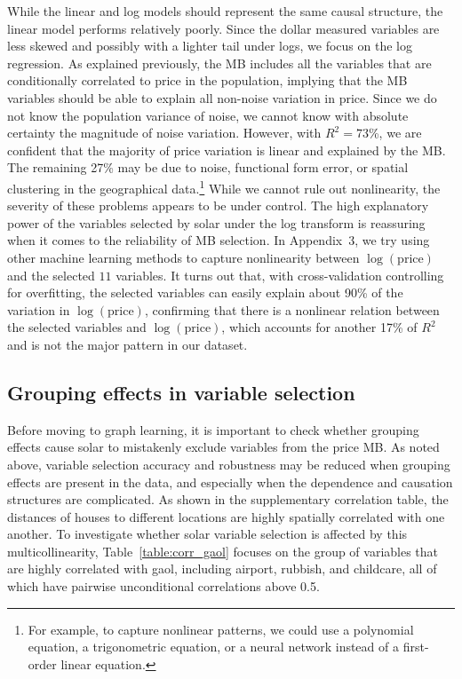 \documentclass[11pt,review,authoryear]{elsarticle}
\begin{document}
While the linear and log models should represent the same causal structure, the linear model performs relatively poorly. Since the dollar measured variables are less skewed and possibly with a lighter tail under logs, we focus on the log regression. As explained previously, the MB includes all the variables that are conditionally correlated to price in the population, implying that the MB variables should be able to explain all non-noise variation in price. Since we do not know the population variance of noise, we cannot know with absolute certainty the magnitude of noise variation. However, with $R^2=73$\%, we are confident that the majority of price variation is linear and explained by the MB. The remaining 27\% may be due to noise, functional form error, or spatial clustering in the geographical data.\footnote{For example, to capture nonlinear patterns, we could use a polynomial equation, a trigonometric equation, or a neural network instead of a first-order linear equation.} While we cannot rule out nonlinearity, the severity of these problems appears to be under control. The high explanatory power of the variables selected by solar under the log transform is reassuring when it comes to the reliability of MB selection. In Appendix~3, we try using other machine learning methods to capture nonlinearity between $\log \left( \mathrm{price} \right)$ and the selected $11$ variables. \textcolor[rgb]{0.00,0.00,1.00}{It turns out that, with cross-validation controlling for overfitting, the selected variables can easily explain about 90\% of the variation in $\log \left( \mathrm{price} \right)$, confirming that there is a nonlinear relation between the selected variables and $\log \left( \mathrm{price} \right)$, which accounts for another 17\% of $R^2$ and is not the major pattern in our dataset.}

\subsection{Grouping effects in variable selection}

Before moving to graph learning, it is important to check whether grouping effects cause solar to mistakenly exclude variables from the price MB. As noted above, variable selection accuracy and robustness may be reduced when grouping effects are present in the data, and especially when the dependence and causation structures are complicated. As shown in the supplementary correlation table, the distances of houses to different locations are highly spatially correlated with one another. To investigate whether solar variable selection is affected by this multicollinearity, Table~\ref{table:corr_gaol} focuses on the group of variables that are highly correlated with gaol, including airport, rubbish, and childcare, all of which have pairwise unconditional correlations above 0.5.
\end{document}
